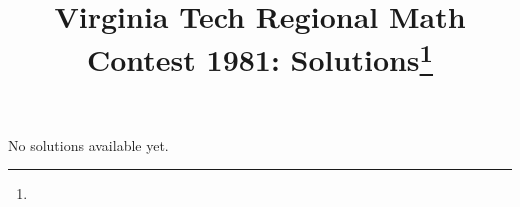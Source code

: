 \documentclass[10pt]{article}
\begin{document}
\title{Virginia Tech Regional Math Contest 1981: Solutions\footnote{\disclaimer}}
\author{\vspace{-2ex}}
\date{\vspace{-5ex}} %
\maketitle

No solutions available yet.

%

%

%

%

%

%

%

%
\end{document}
